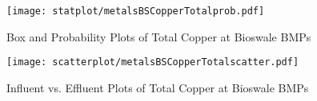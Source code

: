         \begin{figure}[hb]   %
            \centering
            \texttt{[image: statplot/metalsBSCopperTotalprob.pdf]}
            \caption{Box and Probability Plots of Total Copper at Bioswale BMPs}
        \end{figure}         %
        
        
        \begin{figure}[hb]   %
            \centering
            \texttt{[image: scatterplot/metalsBSCopperTotalscatter.pdf]}
            \caption{Influent vs. Effluent Plots of Total Copper at Bioswale BMPs}
        \end{figure}         %
        \clearpage
        